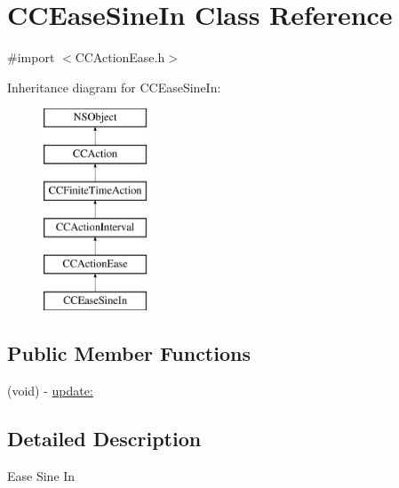 \hypertarget{interface_c_c_ease_sine_in}{\section{C\-C\-Ease\-Sine\-In Class Reference}
\label{interface_c_c_ease_sine_in}
}


{\ttfamily \#import $<$C\-C\-Action\-Ease.\-h$>$}

Inheritance diagram for C\-C\-Ease\-Sine\-In\-:\begin{figure}[H]
\begin{center}
\leavevmode
\includegraphics[height=6.000000cm]{interface_c_c_ease_sine_in}
\end{center}
\end{figure}
\subsection*{Public Member Functions}
\begin{DoxyCompactItemize}
\item 
(void) -\/ \hyperlink{interface_c_c_ease_sine_in_a786c99d69bd0b1de52ef1bcc6a44109d}{update\-:}
\end{DoxyCompactItemize}


\subsection{Detailed Description}
Ease Sine In 

